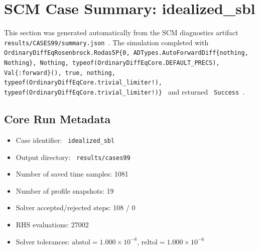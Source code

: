 \section{SCM Case Summary: idealized\_sbl}
\label{sec:scm_case_cases99_cases99_80x2m_9h_report}

This section was generated automatically from the SCM diagnostics artifact
\texttt{ results/CASES99/summary.json }. The simulation completed with \texttt{ OrdinaryDiffEqRosenbrock.Rodas5P\{0, ADTypes.AutoForwardDiff\{nothing, Nothing\}, Nothing, typeof(OrdinaryDiffEqCore.DEFAULT\_PRECS), Val\{:forward\}(), true, nothing, typeof(OrdinaryDiffEqCore.trivial\_limiter!), typeof(OrdinaryDiffEqCore.trivial\_limiter!)\} }
and returned \texttt{ Success }.

\subsection{Core Run Metadata}
\begin{itemize}
  \item Case identifier: \texttt{ idealized\_sbl }
  \item Output directory: \texttt{ results/cases99 }
  \item Number of saved time samples: 1081
  \item Number of profile snapshots: 19
  \item Solver accepted/rejected steps: 108 / 0
  \item RHS evaluations: 27002
  \item Solver tolerances: $\mathrm{abstol}=1.000 \times 10^{-8}$, $\mathrm{reltol}=1.000 \times 10^{-6}$
\end{itemize}

